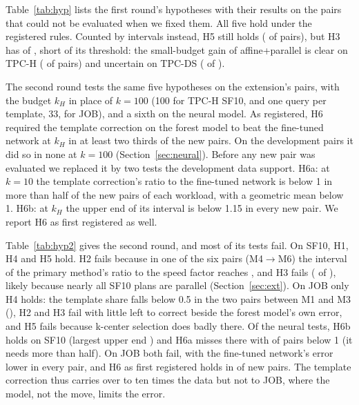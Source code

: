 \documentclass[conference]{IEEEtran}
\newcommand{\inputif}[1]{\IfFileExists{#1}{}{}}
\begin{document}
Table~\ref{tab:hyp} lists the first round's hypotheses with their results
on the \PHPairs{} pairs that could not be evaluated when we fixed them. All
five hold under the registered rules. Counted by intervals instead, H5 still
holds (\PHHFiveOkCI{} of \PHHFiveN{} pairs), but H3 has \PHHThreeOkCI{} of
\PHHThreeN, short of its threshold: the small-budget gain of affine+parallel
is clear on TPC-H (\XtraTpchHThreeCI{} of \XtraTpchHThreeN{} pairs) and
uncertain on TPC-DS (\XtraTpcdsHThreeCI{} of \XtraTpcdsHThreeN).

The second round tests the same five hypotheses on the extension's pairs,
with the budget $k_H$ in place of $k=100$ (100 for TPC-H SF10, and one query
per template, 33, for JOB), and a sixth on the neural model. As registered,
H6 required the template correction on the forest model to beat the
fine-tuned network at $k_H$ in at least two thirds of the new pairs. On the
development pairs it did so in none at $k=100$ (Section~\ref{sec:neural}).
Before any new pair was evaluated we replaced it by two tests the
development data support. H6a: at $k=10$ the template correction's ratio to
the fine-tuned network is below 1 in more than half of the new pairs of each
workload, with a geometric mean below 1. H6b: at $k_H$ the upper end of its
interval is below 1.15 in every new pair. We report H6 as first registered
as well.

\begin{table}[t]
\caption{The second round's tests, fixed before any of its labels existed: TPC-H at SF10 (E1, the 6 ordered pairs among M3, M4 and M6) and JOB (E2, the 20 pairs among M1, M2, M3, M4 and M6), with $k_H$ 100 on E1 and 33, one query per template, on E2. Counts as in Table~\ref{tab:hyp}; H2 gives the pairs below the speed factor and below the ridge correction, H6a the pairs whose ratio is below 1 and the geometric mean of the ratios. H6, as first registered, counts all new pairs together.}
\label{tab:hyp2}
\small
\centering
\inputif{../../results/paper/ext/table_hypotheses_ext.tex}
\end{table}

Table~\ref{tab:hyp2} gives the second round, and most of its tests fail.
On SF10, H1, H4 and H5 hold. H2 fails because in one of the six pairs
(M4$\to$M6) the interval of the primary method's ratio to the speed factor
reaches \XTpchTenHTwoVsSpeedMaxHi, and H3 fails (\XTpchTenHThreeOk{} of
\XTpchTenHThreeN), likely because nearly all SF10 plans are parallel
(Section~\ref{sec:ext}). On JOB only H4 holds: the template share falls
below 0.5 in the two pairs between M1 and M3 (\XJobMOnetoMThreeShare), H2
and H3 fail with little left to correct beside the forest model's own
error, and H5 fails because k-center selection does badly there. Of the
neural tests, H6b holds on SF10 (largest upper end \XTpchTenHSixbMaxHi) and
H6a misses there with \XTpchTenHSixaPoint{} of \XTpchTenHSixaN{} pairs below
1 (it needs more than half). On JOB both fail, with the fine-tuned
network's error lower in every pair, and H6 as first registered holds in
\XAllHSixOk{} of \XAllHSixN{} new pairs. The template correction thus
carries over to ten times the data but not to JOB, where the model, not the
move, limits the error.
\end{document}

